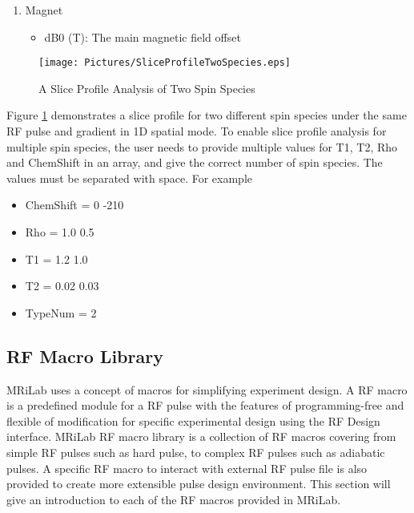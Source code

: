 \documentclass{book}%
\begin{document}
\begin{enumerate}
\begin{enumerate}
\item Magnet

\begin{itemize}
	\item dB0 (T): The main magnetic field offset
\end{itemize}

\end{enumerate}

\begin{figure}[htbp]
	\centering
		\texttt{[image: Pictures/SliceProfileTwoSpecies.eps]}
	\caption{A Slice Profile Analysis of Two Spin Species}
	\label{fig:SliceProfileTwoSpecies}
\end{figure}

Figure \ref{fig:SliceProfileTwoSpecies} demonstrates a slice profile for two different spin species under the same RF pulse and gradient in 1D spatial mode. To enable slice profile analysis for multiple spin species, the user needs to provide multiple values for T1, T2, Rho and ChemShift in an array, and give the correct number of spin species. The values must be separated with space. For example

\begin{itemize}
	\item ChemShift = 0 -210
	\item Rho = 1.0 0.5
	\item T1 = 1.2 1.0
	\item T2 = 0.02 0.03
	\item TypeNum = 2
\end{itemize}

\end{enumerate}

\subsection{RF Macro Library}

MRiLab uses a concept of macros for simplifying experiment design. A RF macro is a predefined module for a RF pulse with the features of programming-free and flexible of modification for specific experimental design using the RF Design interface. MRiLab RF macro library is a collection of RF macros covering from simple RF pulses such as hard pulse, to complex RF pulses such as adiabatic pulses. A specific RF macro to interact with external RF pulse file is also provided to create more extensible pulse design environment. This section will give an introduction to each of the RF macros provided in MRiLab.
\end{document}
